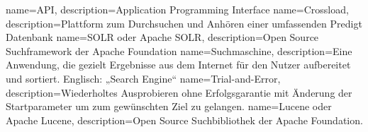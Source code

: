 {
    name={API},
    description={Application Programming Interface}
}
{
    name={Crossload},
    description={Plattform zum Durchsuchen und Anhören einer umfassenden Predigt Datenbank}
}
{
    name={SOLR oder Apache SOLR},
    description={Open Source Suchframework der Apache Foundation}
}
{
    name={Suchmaschine},
    description={Eine Anwendung, die gezielt Ergebnisse aus dem Internet für den Nutzer aufbereitet und sortiert. Englisch: „Search Engine“}
}
{
    name={Trial-and-Error},
    description={Wiederholtes Ausprobieren ohne Erfolgsgarantie mit Änderung der Startparameter um zum gewünschten Ziel zu gelangen.}
}
{
    name={Lucene oder Apache Lucene},
    description={Open Source Suchbibliothek der Apache Foundation.}
}


\glsaddall
